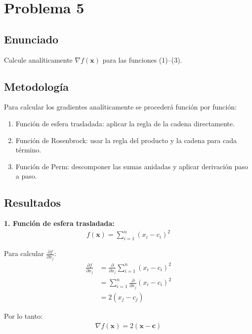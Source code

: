 \documentclass{article}
\begin{document}
\section{Problema 5}

\subsection{Enunciado}
Calcule analíticamente $\nabla f(\mathbf{x})$ para las funciones (1)--(3).

\subsection{Metodología}

Para calcular los gradientes analíticamente se procederá función por función:
\begin{enumerate}
    \item Función de esfera trasladada: aplicar la regla de la cadena directamente.
    \item Función de Rosenbrock: usar la regla del producto y la cadena para cada término.
    \item Función de Perm: descomponer las sumas anidadas y aplicar derivación paso a paso.
\end{enumerate}

\subsection{Resultados}
\setcounter{equation}{0}

\textbf{1. Función de esfera trasladada:}
\begin{align}
f(\mathbf{x}) = \sum_{i=1}^{n} (x_i - c_i)^2
\end{align}

Para calcular $\frac{\partial f}{\partial x_j}$:
\begin{align}
\frac{\partial f}{\partial x_j} &= \frac{\partial}{\partial x_j} \sum_{i=1}^{n} (x_i - c_i)^2 \\
&= \sum_{i=1}^{n} \frac{\partial}{\partial x_j} (x_i - c_i)^2 \\
&= 2(x_j - c_j)
\end{align}

Por lo tanto:
\begin{align}
\nabla f(\mathbf{x}) = 2(\mathbf{x} - \mathbf{c})
\end{align}
\end{document}
